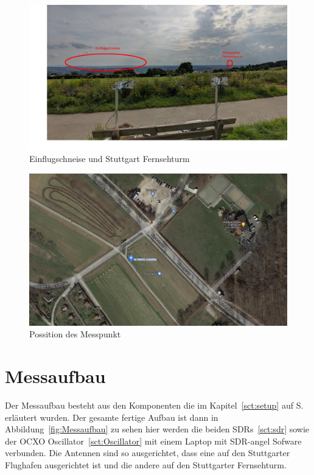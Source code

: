 \begin{figure}
    \centering
    \includegraphics[width=\textwidth]{images/Einflugschneise.jpg}
    \caption{Einflugschneise und Stuttgart Fernsehturm}\label{fig:Einflugschneise}
\end{figure}

\begin{figure}
    \centering
    \includegraphics[width=\textwidth]{images/Maps_Messpunkt.png}
    \caption{Possition des Messpunkt}\label{fig:Maps}
\end{figure}

\section{Messaufbau}
Der Messaufbau besteht aus den Komponenten die im Kapitel~\ref{sct:setup} auf S.\pageref{sct:setup} erläutert wurden. Der gesamte fertige Aufbau ist dann in Abbildung~\ref{fig:Messaufbau} zu sehen hier werden die beiden SDRs~\ref{sct:sdr} sowie der OCXO Oscillator~\ref{sct:Oscillator} mit einem Laptop mit SDR-angel Sofware verbunden. Die Antennen sind so ausgerichtet, dass eine auf den Stuttgarter Flughafen ausgerichtet ist und die andere auf den Stuttgarter Fernsehturm.

